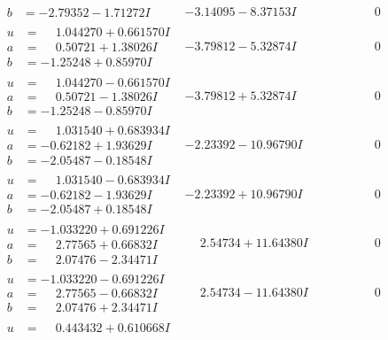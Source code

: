 \documentclass[1p]{elsarticle_modified}
\theoremstyle{definition}
\begin{document}
$$\begin{array}{c|c|c}
\begin{aligned}
b &= -2.79352 - 1.71272 I\end{aligned}
 & -3.14095 - 8.37153 I & \phantom{-0.000000 } 0 \\ \hline\begin{aligned}
u &= \phantom{-}1.044270 + 0.661570 I \\
a &= \phantom{-}0.50721 + 1.38026 I \\
b &= -1.25248 + 0.85970 I\end{aligned}
 & -3.79812 - 5.32874 I & \phantom{-0.000000 } 0 \\ \hline\begin{aligned}
u &= \phantom{-}1.044270 - 0.661570 I \\
a &= \phantom{-}0.50721 - 1.38026 I \\
b &= -1.25248 - 0.85970 I\end{aligned}
 & -3.79812 + 5.32874 I & \phantom{-0.000000 } 0 \\ \hline\begin{aligned}
u &= \phantom{-}1.031540 + 0.683934 I \\
a &= -0.62182 + 1.93629 I \\
b &= -2.05487 - 0.18548 I\end{aligned}
 & -2.23392 - 10.96790 I & \phantom{-0.000000 } 0 \\ \hline\begin{aligned}
u &= \phantom{-}1.031540 - 0.683934 I \\
a &= -0.62182 - 1.93629 I \\
b &= -2.05487 + 0.18548 I\end{aligned}
 & -2.23392 + 10.96790 I & \phantom{-0.000000 } 0 \\ \hline\begin{aligned}
u &= -1.033220 + 0.691226 I \\
a &= \phantom{-}2.77565 + 0.66832 I \\
b &= \phantom{-}2.07476 - 2.34471 I\end{aligned}
 & \phantom{-}2.54734 + 11.64380 I & \phantom{-0.000000 } 0 \\ \hline\begin{aligned}
u &= -1.033220 - 0.691226 I \\
a &= \phantom{-}2.77565 - 0.66832 I \\
b &= \phantom{-}2.07476 + 2.34471 I\end{aligned}
 & \phantom{-}2.54734 - 11.64380 I & \phantom{-0.000000 } 0 \\ \hline\begin{aligned}
u &= \phantom{-}0.443432 + 0.610668 I \\

\end{aligned}
\end{array}$$
\end{document}
